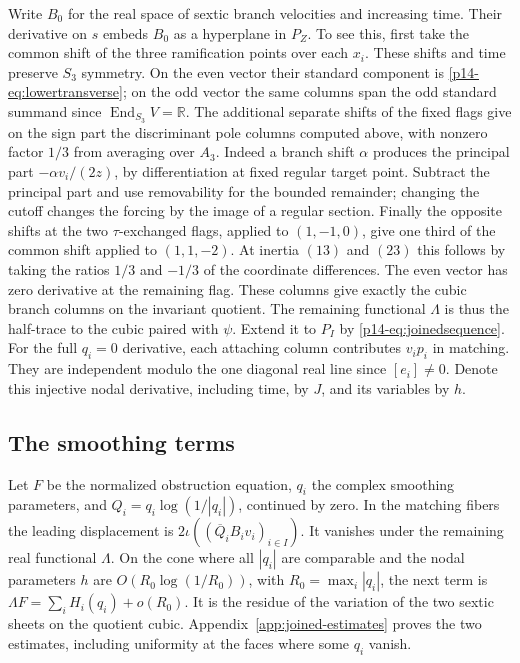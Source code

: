 Write $B_0$ for the real space of sextic branch velocities and
increasing time. Their derivative on $s$ embeds $B_0$ as a hyperplane
in $P_Z$. To see this, first take the common shift of the three
ramification points over each $x_i$. These shifts and time preserve
$S_3$ symmetry. On the even vector their standard component is
\eqref{p14-eq:lowertransverse}; on the odd vector the same columns span
the odd standard summand since $\operatorname{End}_{S_3}V=\mathbb R$.
The additional separate shifts of the fixed flags give on the sign
part the discriminant pole columns computed above, with nonzero
factor $1/3$ from averaging over $A_3$. Indeed a branch shift $\alpha$
produces the principal part $-\alpha v_i/(2z)$, by differentiation
at fixed regular target point. Subtract the principal part and use
removability for the bounded remainder; changing the cutoff changes
the forcing by the image of a regular section. Finally the opposite
shifts at the two $\tau$-exchanged flags, applied to $(1,-1,0)$,
give one third of the common shift applied to $(1,1,-2)$.
At inertia $(13)$ and $(23)$ this follows by taking the ratios
$1/3$ and $-1/3$ of the coordinate differences. The even vector has
zero derivative at the remaining flag. These columns give exactly
the cubic branch columns on the invariant quotient. The remaining
functional $\Lambda$ is thus the half-trace to the cubic paired
with $\psi$. Extend it to $P_I$ by \eqref{p14-eq:joinedsequence}.
For the full $q_i=0$ derivative, each attaching column contributes
$v_ip_i$ in matching. They are independent modulo the one diagonal
real line since $[e_i]\ne0$. Denote this injective nodal derivative,
including time, by $J$, and its variables by $h$.


\subsection{The smoothing terms}
Let $F$ be the normalized obstruction equation, $q_i$ the complex
smoothing parameters, and $Q_i=q_i\log(1/|q_i|)$, continued by zero.
In the matching fibers the leading displacement is
$2\iota((\overline{Q}_i B_i v_i)_{i\in I})$. It vanishes under the
remaining real functional $\Lambda$. On the cone where all $|q_i|$
are comparable and the nodal parameters $h$ are
$O(R_0\log(1/R_0))$, with $R_0=\max_i|q_i|$, the next term is
$\Lambda F=\sum_i H_i(q_i)+o(R_0)$. It is the residue of the
variation of the two sextic sheets on the quotient cubic.
Appendix~\ref{app:joined-estimates} proves the two estimates,
including uniformity at the faces where some $q_i$ vanish.

